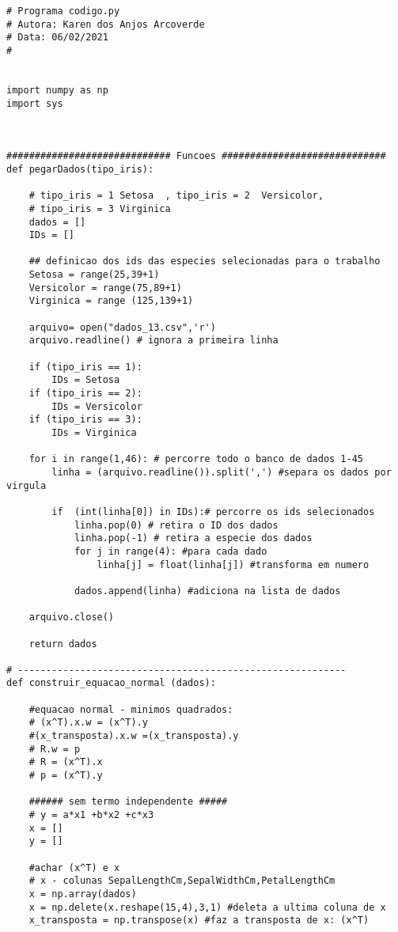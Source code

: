 \documentclass[a4paper,12pt,twoside]{article}
\begin{document}
\begin{lstlisting}
# Programa codigo.py
# Autora: Karen dos Anjos Arcoverde
# Data: 06/02/2021
#


import numpy as np
import sys



############################# Funcoes #############################
def pegarDados(tipo_iris): 
    
    # tipo_iris = 1 Setosa  , tipo_iris = 2  Versicolor, 
    # tipo_iris = 3 Virginica
    dados = []
    IDs = []
    
    ## definicao dos ids das especies selecionadas para o trabalho
    Setosa = range(25,39+1)
    Versicolor = range(75,89+1)
    Virginica = range (125,139+1)
    
    arquivo= open("dados_13.csv",'r')
    arquivo.readline() # ignora a primeira linha
    
    if (tipo_iris == 1):
        IDs = Setosa
    if (tipo_iris == 2):
        IDs = Versicolor
    if (tipo_iris == 3):
        IDs = Virginica
        
    for i in range(1,46): # percorre todo o banco de dados 1-45
        linha = (arquivo.readline()).split(',') #separa os dados por virgula
    
        if  (int(linha[0]) in IDs):# percorre os ids selecionados
            linha.pop(0) # retira o ID dos dados
            linha.pop(-1) # retira a especie dos dados
            for j in range(4): #para cada dado 
                linha[j] = float(linha[j]) #transforma em numero
                
            dados.append(linha) #adiciona na lista de dados
            
    arquivo.close()
    
    return dados

# ----------------------------------------------------------
def construir_equacao_normal (dados):
    
    #equacao normal - minimos quadrados:
    # (x^T).x.w = (x^T).y
    #(x_transposta).x.w =(x_transposta).y
    # R.w = p
    # R = (x^T).x
    # p = (x^T).y
    
    ###### sem termo independente #####
    # y = a*x1 +b*x2 +c*x3
    x = []
    y = []
    
    #achar (x^T) e x
    # x - colunas SepalLengthCm,SepalWidthCm,PetalLengthCm
    x = np.array(dados) 
    x = np.delete(x.reshape(15,4),3,1) #deleta a ultima coluna de x
    x_transposta = np.transpose(x) #faz a transposta de x: (x^T)
       

\end{lstlisting}
\end{document}
